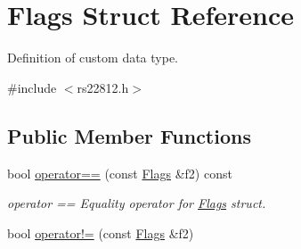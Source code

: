 \hypertarget{struct_flags}{\section{Flags Struct Reference}
\label{struct_flags}
}


Definition of custom data type.  




{\ttfamily \#include $<$rs22812.\-h$>$}

\subsection*{Public Member Functions}
\begin{DoxyCompactItemize}
\item 
bool \hyperlink{struct_flags_adc9e557a0b9b87c6d19963480ee88cf3}{operator==} (const \hyperlink{struct_flags}{Flags} \&f2) const 
\begin{DoxyCompactList}\small\item\em operator == Equality operator for \hyperlink{struct_flags}{Flags} struct. \end{DoxyCompactList}\item 
bool \hyperlink{struct_flags_a35a9bea4730ee6c5e98a7d08110c8692}{operator!=} (const \hyperlink{struct_flags}{Flags} \&f2)
\end{DoxyCompactItemize}
